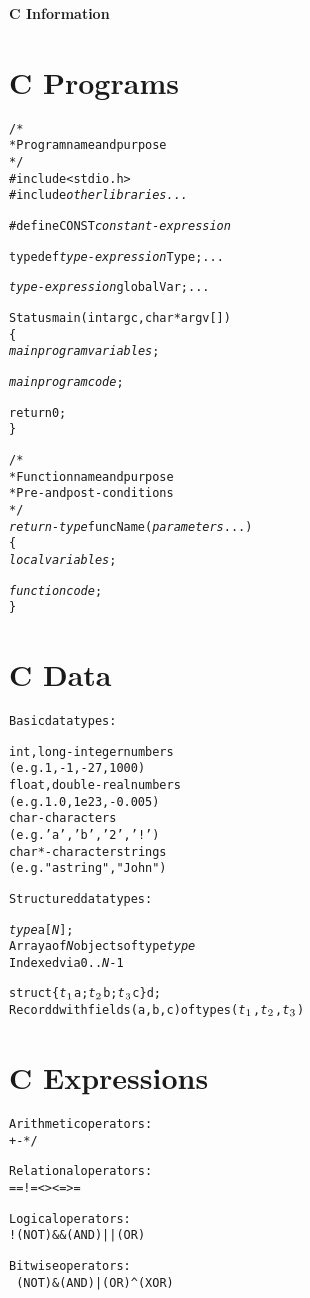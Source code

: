 \documentclass[twocolumn,12pt]{article}
\begin{document}
\noindent


\newpage
\noindent
\textbf{\Huge C Information}

\section*{C Programs}
\begin{alltt}
/*
 * Program name and purpose
 */
#include <stdio.h>
#include \emph{other libraries ...}

#define CONST \emph{constant-expression}

typedef \emph{type-expression} Type; ...

\emph{type-expression} globalVar; ...

Status main(int argc, char *argv[])
\{
   \emph{main program variables};

   \emph{main program code};

   return 0;
\}

/*
 * Function name and purpose
 * Pre- and post- conditions
 */
\emph{return-type} funcName(\emph{parameters} ...)
\{
   \emph{local variables};

   \emph{function code};
\}
\end{alltt}
\section*{C Data}
\begin{alltt}
\textrm{Basic data types:}

int, long     - \textrm{integer numbers}
                (e.g. 1, -1, -27, 1000)
float, double - \textrm{real numbers}
                (e.g. 1.0, 1e23, -0.005)
char          - \textrm{characters}
                (e.g. 'a', 'b', '2', '!')
char *        - \textrm{character strings}
                (e.g. "a string", "John")

\textrm{Structured data types:}

\emph{type} a[\emph{N}];
   \textrm{Array} a \textrm{of} \emph{N} \textrm{objects of type} \emph{type}
   \textrm{Indexed via} 0 .. \emph{N}-1

struct \{\emph{t\(\sb{1}\)} a; \emph{t\(\sb{2}\)} b; \emph{t\(\sb{3}\)} c\} d;
   \textrm{Record} d \textrm{with fields} (a,b,c) \textrm{of types} (\emph{t\(\sb{1}\)},\emph{t\(\sb{2}\)},\emph{t\(\sb{3}\)})
\end{alltt}

\section*{C Expressions}
\begin{alltt}
\textrm{Arithmetic operators:}
   +   -   *   /   % \textrm{\tiny(modulus)}

\textrm{Relational operators:}
   ==   !=   <   >   <=   >=

\textrm{Logical operators:}
   ! \textrm{\tiny(NOT)}   && \textrm{\tiny(AND)}   || \textrm{\tiny(OR)}

\textrm{Bitwise operators:}
   ~ \textrm{\tiny(NOT)}   & \textrm{\tiny(AND)}   | \textrm{\tiny(OR)}   ^ \textrm{\tiny(XOR)}
\end{alltt}
\end{document}
